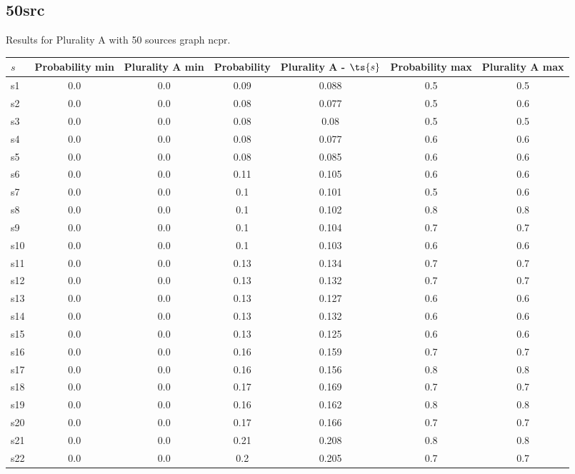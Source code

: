 \documentclass{article}
\begin{document}
\newpage

\subsection{50src}

\noindent Results for Plurality A with 50 sources graph ncpr.

\noindent\begin{tabular}{|l|c|c|c|c|c|c|}
\hline
$s$& Probability min & Plurality A min & Probability & Plurality A - $\ts{s}$ & Probability max & Plurality A max\\
\hline
s1 &0.0 & 0.0 & 0.09 & 0.088 & 0.5 & 0.5\\
\hline
s2 &0.0 & 0.0 & 0.08 & 0.077 & 0.5 & 0.6\\
\hline
s3 &0.0 & 0.0 & 0.08 & 0.08 & 0.5 & 0.5\\
\hline
s4 &0.0 & 0.0 & 0.08 & 0.077 & 0.6 & 0.6\\
\hline
s5 &0.0 & 0.0 & 0.08 & 0.085 & 0.6 & 0.6\\
\hline
s6 &0.0 & 0.0 & 0.11 & 0.105 & 0.6 & 0.6\\
\hline
s7 &0.0 & 0.0 & 0.1 & 0.101 & 0.5 & 0.6\\
\hline
s8 &0.0 & 0.0 & 0.1 & 0.102 & 0.8 & 0.8\\
\hline
s9 &0.0 & 0.0 & 0.1 & 0.104 & 0.7 & 0.7\\
\hline
s10 &0.0 & 0.0 & 0.1 & 0.103 & 0.6 & 0.6\\
\hline
s11 &0.0 & 0.0 & 0.13 & 0.134 & 0.7 & 0.7\\
\hline
s12 &0.0 & 0.0 & 0.13 & 0.132 & 0.7 & 0.7\\
\hline
s13 &0.0 & 0.0 & 0.13 & 0.127 & 0.6 & 0.6\\
\hline
s14 &0.0 & 0.0 & 0.13 & 0.132 & 0.6 & 0.6\\
\hline
s15 &0.0 & 0.0 & 0.13 & 0.125 & 0.6 & 0.6\\
\hline
s16 &0.0 & 0.0 & 0.16 & 0.159 & 0.7 & 0.7\\
\hline
s17 &0.0 & 0.0 & 0.16 & 0.156 & 0.8 & 0.8\\
\hline
s18 &0.0 & 0.0 & 0.17 & 0.169 & 0.7 & 0.7\\
\hline
s19 &0.0 & 0.0 & 0.16 & 0.162 & 0.8 & 0.8\\
\hline
s20 &0.0 & 0.0 & 0.17 & 0.166 & 0.7 & 0.7\\
\hline
s21 &0.0 & 0.0 & 0.21 & 0.208 & 0.8 & 0.8\\
\hline
s22 &0.0 & 0.0 & 0.2 & 0.205 & 0.7 & 0.7\\

\end{tabular}
\end{document}
